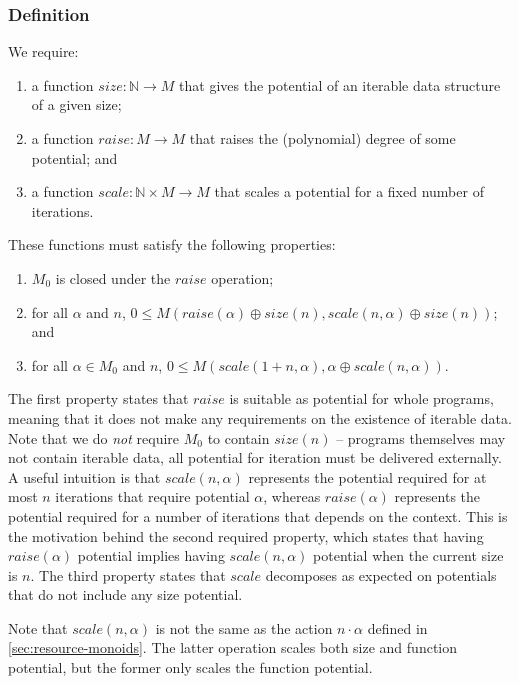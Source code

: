\documentclass[acmsmall,screen]{acmart}
\begin{document}
\subsubsection{Definition}
We require:
\begin{enumerate}
\item a function $\mathit{size} : \mathbb{N} \to M$ that gives the
  potential of an iterable data structure of a given
  size;
\item a function $\mathit{raise} : M \to M$ that raises the
  (polynomial) degree of some potential; and
\item a function $\mathit{scale} : \mathbb{N} \times M \to M$ that
  scales a potential for a fixed number of iterations.
\end{enumerate}
These functions must satisfy the following properties:
\begin{enumerate}
\item $M_0$ is closed under the $\mathit{raise}$ operation;
\item for all $\alpha$ and $n$,
  $0 \leq M(\mathit{raise}(\alpha) \oplus \mathit{size}(n),
  \mathit{scale}(n,\alpha) \oplus \mathit{size}(n))$; and
\item for all $\alpha \in M_0$ and $n$,
  $0 \leq M(\mathit{scale}(1 + n, \alpha), \alpha \oplus
  \mathit{scale}(n, \alpha))$.
\end{enumerate}
The first property states that $\mathit{raise}$ is suitable as
potential for whole programs, meaning that it does not make any
requirements on the existence of iterable data. Note that we do
\emph{not} require $M_0$ to contain $\mathit{size}(n)$ -- programs
themselves may not contain iterable data, all potential for iteration
must be delivered externally. A useful intuition is that
$\mathit{scale}(n,\alpha)$ represents the potential required for at
most $n$ iterations that require potential $\alpha$, whereas
$\mathit{raise}(\alpha)$ represents the potential required for a
number of iterations that depends on the context. This is the
motivation behind the second required property, which states that
having $\mathit{raise}(\alpha)$ potential implies having
$\mathit{scale}(n,\alpha)$ potential when the current size is $n$. The
third property states that $\mathit{scale}$ decomposes as expected on
potentials that do not include any size potential.

Note that $\mathit{scale}(n,\alpha)$ is not the same as the action
$n \cdot \alpha$ defined in \autoref{sec:resource-monoids}. The latter
operation scales both size and function potential, but the former only
scales the function potential.
\end{document}
